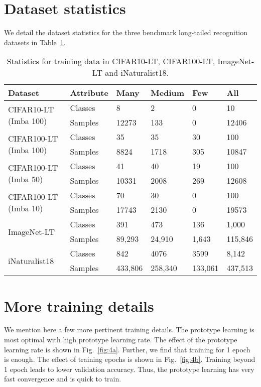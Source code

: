\documentclass{article}
\begin{document}
\section{Dataset statistics}
We detail the dataset statistics for the three benchmark long-tailed recognition datasets in Table~\ref{tab:table 7}.
\begin{table}[h]
\small
\centering
\begin{tabular}{ p{2cm} | p{1cm} | p{0.8cm} p{0.8cm} p{0.8cm} p{1cm} }
\toprule
Dataset & Attribute & Many & Medium & Few & All \\
 \midrule
\multirow{2}{2cm}{CIFAR10-LT (Imba 100)} & Classes & 8 & 2 & 0 & 10 \\
 & Samples & 12273 & 133 & 0 & 12406 \\
 \midrule
 \multirow{2}{2cm}{CIFAR100-LT (Imba 100)} & Classes & 35 & 35 & 30 & 100 \\
 & Samples & 8824 & 1718 & 305 & 10847 \\
 \midrule
 \multirow{2}{2cm}{CIFAR100-LT (Imba 50)} & Classes & 41 & 40 & 19 & 100 \\
 & Samples & 10331 & 2008 & 269 & 12608 \\
 \midrule
 \multirow{2}{2cm}{CIFAR100-LT (Imba 10)} & Classes & 70 & 30 & 0 & 100 \\
 & Samples & 17743 & 2130 & 0 & 19573 \\
\midrule
\multirow{2}{2cm}{ImageNet-LT} & Classes & 391 & 473 & 136 & 1,000 \\
 & Samples & 89,293 & 24,910 & 1,643 & 115,846 \\
 \midrule
\multirow{2}{2cm}{iNaturalist18} & Classes & 842 & 4076 & 3599 & 8,142 \\
 & Samples & 433,806 & 258,340 & 133,061 & 437,513 \\
\bottomrule
\end{tabular}
\caption{Statistics for training data in CIFAR10-LT, CIFAR100-LT, ImageNet-LT and iNaturalist18.}
\label{tab:table 7}
\end{table}

\section{More training details}
We mention here a few more pertinent training details. The prototype learning is most optimal with high prototype learning rate. The effect of the prototype learning rate is shown in Fig.~\ref{fig:4a}. Further, we find that training for 1 epoch is enough. The effect of training epochs is shown in Fig.~\ref{fig:4b}. Training beyond 1 epoch leads to lower validation accuracy. Thus, the prototype learning has very fast convergence and is quick to train. 
\end{document}
